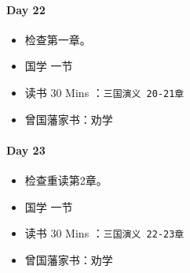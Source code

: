 \documentclass[UTF8,a4paper,8pt]{ctexart}
\begin{document}
 	 \paragraph{Day 22      \quad     }
	 	 \begin{itemize}[itemindent = 1em]
	 	 	\renewcommand\labelitemi{\makebox[0pt][l]{$\square$}\raisebox{.15ex}{\hspace{0.1em}$\checkmark$}}		
	 	 	
	 	 	\item    检查第一章。
	 	 	
	 	 	\renewcommand\labelitemi{\makebox[0pt][l]{$\square$}\hspace{1em}}
	 	 	\item   国学  一节
	 	 	\item   读书  30 Mins	：\verb|三国演义 20-21章|
	 	 	\item   曾国藩家书：劝学
	 	 \end{itemize}
 	 \paragraph{Day 23      \quad     }
	 	 \begin{itemize}[itemindent = 1em]
	 	 	\renewcommand\labelitemi{\makebox[0pt][l]{$\square$}\raisebox{.15ex}{\hspace{0.1em}$\checkmark$}}		
	 	 	
	 	 	\item    检查重读第2章。
	 	 	
	 	 	\renewcommand\labelitemi{\makebox[0pt][l]{$\square$}\hspace{1em}}
	 	 	\item   国学  一节
	 	 	\item   读书  30 Mins	：\verb|三国演义 22-23章|
	 	 	\item   曾国藩家书：劝学
	 	 \end{itemize}
	 	 
\end{document}
